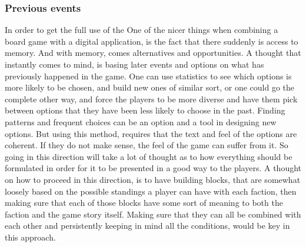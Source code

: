 \subsubsection{Previous events}
In order to get the full use of the 
One of the nicer things when combining a board game with a digital application, is the fact that there suddenly is access to memory. And with memory, comes alternatives and opportunities. A thought that instantly comes to mind, is basing later events and options on what has previously happened in the game. One can use statistics to see which options is more likely to be chosen, and build new ones of similar sort, or one could go the complete other way, and force the players to be more diverse and have them pick between options that they have been less likely to choose in the past. Finding patterns and frequent choices can be an option and a tool in designing new options. But using this method, requires that the text and feel of the options are coherent. If they do not make sense, the feel of the game can suffer from it. So going in this direction will take a lot of thought as to how everything should be formulated in order for it to be presented in a good way to the players. A thought on how to proceed in this direction, is to have building blocks, that are somewhat loosely based on the possible standings a player can have with each faction, then making sure that each of those blocks have some sort of meaning to both the faction and the game story itself. Making sure that they can all be combined with each other and persistently keeping in mind all the conditions, would be key in this approach.

